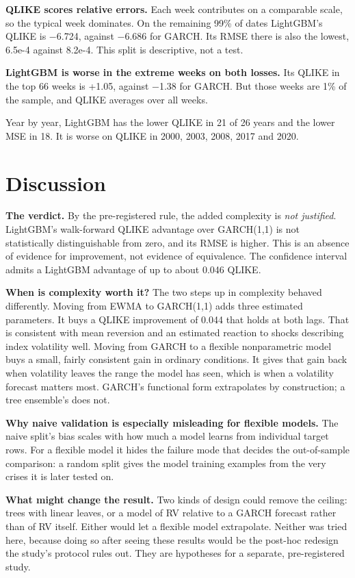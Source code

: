 \documentclass[11pt]{article}
\begin{document}
\textbf{QLIKE scores relative errors.} Each week contributes on a comparable
scale, so the typical week dominates. On the remaining 99\% of dates
LightGBM's QLIKE is −6.724, against −6.686 for GARCH. Its RMSE there is
also the lowest, 6.5e-4 against 8.2e-4. This split is descriptive, not a
test.

\textbf{LightGBM is worse in the extreme weeks on both losses.} Its QLIKE in
the top 66 weeks is +1.05, against −1.38 for GARCH. But those weeks are 1\%
of the sample, and QLIKE averages over all weeks.

Year by year, LightGBM has the lower QLIKE in 21 of 26 years and the lower
MSE in 18. It is worse on QLIKE in 2000, 2003, 2008, 2017 and 2020.

\hypertarget{discussion}{%
\section{Discussion}\label{discussion}}

\textbf{The verdict.} By the pre-registered rule, the added complexity is \emph{not
justified}. LightGBM's walk-forward QLIKE advantage over GARCH(1,1) is not
statistically distinguishable from zero, and its RMSE is higher. This is
an absence of evidence for improvement, not evidence of equivalence. The
confidence interval admits a LightGBM advantage of up to about 0.046
QLIKE.

\textbf{When is complexity worth it?} The two steps up in complexity behaved
differently. Moving from EWMA to GARCH(1,1) adds three estimated
parameters. It buys a QLIKE improvement of 0.044 that holds at both lags.
That is consistent with mean reversion and an estimated reaction to shocks
describing index volatility well. Moving from GARCH to a flexible nonparametric model buys
a small, fairly consistent gain in ordinary conditions. It gives that gain
back when volatility leaves the range the model has seen, which is when a
volatility forecast matters most. GARCH's functional form extrapolates by
construction; a tree ensemble's does not.

\textbf{Why naive validation is especially misleading for flexible models.}
The naive split's bias scales with how much a model learns from individual
target rows. For a flexible model it hides the failure mode that decides
the out-of-sample comparison: a random split gives the model training
examples from the very crises it is later tested on.

\textbf{What might change the result.} Two kinds of design could remove the
ceiling: trees with linear leaves, or a model of RV relative to a GARCH
forecast rather than of RV itself. Either would let a flexible model
extrapolate. Neither was tried here, because doing so after seeing these
results would be the post-hoc redesign the study's protocol rules out.
They are hypotheses for a separate, pre-registered study.
\end{document}
